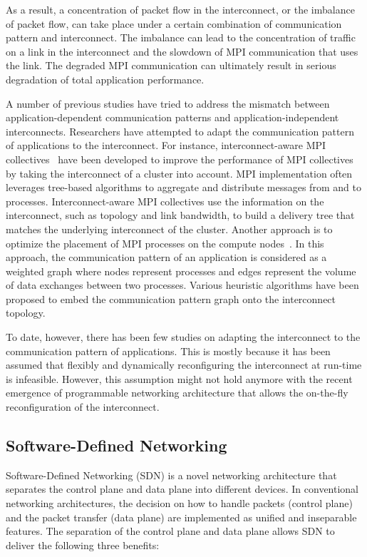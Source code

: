 As a result, a concentration of packet flow in the interconnect, or the
imbalance of packet flow, can take place under a certain combination of
communication pattern and interconnect. The imbalance can lead to the
concentration of traffic on a link in the interconnect and the slowdown of MPI
communication that uses the link. The degraded MPI communication can
ultimately result in serious degradation of total application performance.

A  number of previous studies have tried to address the mismatch between
application-dependent communication patterns and application-independent
interconnects. Researchers have attempted to adapt the communication
pattern of applications to the interconnect. For instance, interconnect-aware
MPI collectives~\autocite{Kumar2016,Kumar2014,Gong2015,Adachi2013} have been
developed to improve the performance of MPI collectives by taking the
interconnect of a cluster into account. MPI implementation often leverages
tree-based algorithms to aggregate and distribute messages from and to
processes. Interconnect-aware MPI collectives use the information on the
interconnect, such as topology and link bandwidth, to build a delivery tree
that matches the underlying interconnect of the cluster. Another approach is
to optimize the placement of MPI processes on the compute
nodes~\autocite{Michelogiannakis2017,Hoefler2011,Choi2017}. In this
approach, the communication pattern of an application is considered as a
weighted graph where nodes represent processes and edges represent the volume
of data exchanges between two processes. Various heuristic algorithms have
been proposed to embed the communication pattern graph onto the interconnect
topology.

To date, however, there has been few studies on adapting the
interconnect to the communication pattern of applications. This is mostly
because it has been assumed that flexibly and dynamically reconfiguring the
interconnect at run-time is infeasible. However, this assumption might not hold
anymore with the recent emergence of programmable networking architecture that
allows the on-the-fly reconfiguration of the interconnect.

\subsection{Software-Defined Networking}\label{sec:i-sdn}

Software-Defined Networking (SDN) is a novel networking architecture
that separates the control plane and data plane into different devices.
In conventional networking architectures, the decision on how to handle
packets (control plane) and the packet transfer (data plane) are
implemented as unified and inseparable features. The separation of the
control plane and data plane allows SDN to deliver the following three
benefits:

